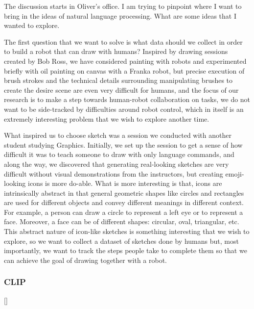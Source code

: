 The discussion starts in Oliver's office. I am trying to pinpoint where I want to bring in the ideas of natural language processing. What are some ideas that I wanted to explore.  


The first question that we want to solve is what data should we collect in order to build a robot that can draw with humans? Inspired by drawing sessions created by Bob Ross, we have considered painting with robots and experimented briefly with oil painting on canvas with a Franka robot, but precise execution of brush strokes and the technical details surrounding manipulating brushes to create the desire scene are even very difficult for humans, and the focus of our research is to make a step towards human-robot collaboration on tasks, we do not want to be side-tracked by difficulties around robot control, which in itself is an extremely interesting problem that we wish to explore another time. 

What inspired us to choose sketch was a session we conducted with another student studying Graphics. Initially, we set up the session to get a sense of how difficult it was to teach someone to draw with only language commands, and along the way, we discovered that generating real-looking sketches are very difficult without visual demonstrations from the instructors, but creating emoji-looking icons is more do-able. What is more interesting is that, icons are intrinsically abstract in that general geometric shapes like circles and rectangles are used for different objects and convey different meanings in different context. For example, a person can draw a circle to represent a left eye or to represent a face. Moreover, a face can be of different shapes: circular, oval, triangular, etc. This abstract nature of icon-like sketches is something interesting that we wish to explore, so we want to collect a dataset of sketches done by humans but, most importantly, we want to track the steps people take to complete them so that we can achieve the goal of drawing together with a robot.    


\subsubsection{CLIP}
[]
